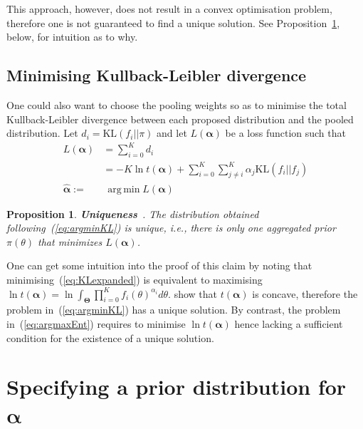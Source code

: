\documentclass[a4paper, notitlepage, 11pt]{article}
\DeclareMathOperator*{\argmin}{arg\,min}
\newtheorem{proposition}{Proposition}[]
\begin{document}
This approach, however, does not result in a convex optimisation problem, therefore one is not guaranteed to find a unique solution. 
See Proposition~\ref{prop:uniqueness}, below, for intuition as to why.

\subsection*{Minimising Kullback-Leibler divergence}

One could also want to choose the pooling weights so as to minimise the total Kullback-Leibler divergence between each proposed distribution and the pooled distribution.
Let $d_i = \text{KL}(f_i || \pi)$ and let $L(\boldsymbol\alpha)$ be a loss function such that
\begin{align}
L(\boldsymbol\alpha) &= \sum_{i=0}^Kd_i \\
\label{eq:KLexpanded}
     &= -K\ln t(\boldsymbol\alpha) + \sum_{i=0}^K\sum_{j\neq i}^K\alpha_j\text{KL}(f_i||f_j) \\
     \label{eq:argminKL}
     \hat{\boldsymbol\alpha}:=& \:\argmin L(\boldsymbol\alpha)   
\end{align}

\begin{proposition}
\label{prop:uniqueness}
\textbf{Uniqueness}~\citep{rufo2012A}.
 The distribution obtained following~(\ref{eq:argminKL}) is unique, i.e., there is only one aggregated prior $\pi(\theta)$ that minimizes $L(\boldsymbol\alpha)$.
\end{proposition}
One can get some intuition into the proof  of this claim by noting that minimising~(\ref{eq:KLexpanded}) is equivalent to maximising $\ln t(\boldsymbol\alpha) = \ln\int_{\boldsymbol\Theta}\prod_{i=0}^{K}f_i(\theta)^{\alpha_i}d\theta$. 
\cite{rufo2012A} show that $t(\boldsymbol\alpha)$ is concave, therefore the problem in~(\ref{eq:argminKL}) has a unique solution.
By contrast, the problem in~(\ref{eq:argmaxEnt}) requires to minimise $\ln t(\boldsymbol\alpha)$ hence lacking a sufficient condition for the existence of a unique solution.

\section*{Specifying a prior distribution for $\boldsymbol\alpha$}
\end{document}
